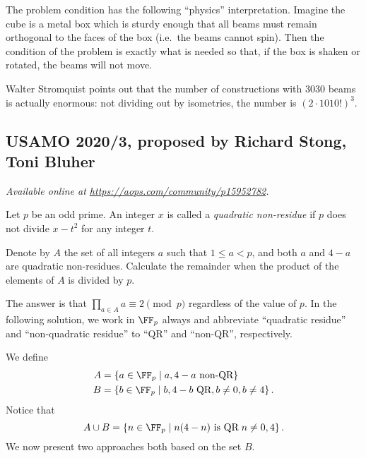 \documentclass[11pt]{scrartcl}
\begin{document}
\begin{remark*}
  The problem condition has the following ``physics'' interpretation.
  Imagine the cube is a metal box which is sturdy enough that
  all beams must remain orthogonal to the faces of the box
  (i.e.\ the beams cannot spin).
  Then the condition of the problem is exactly what is needed so that,
  if the box is shaken or rotated, the beams will not move.
\end{remark*}

\begin{remark*}
  Walter Stromquist points out that the number of constructions
  with $3030$ beams is actually enormous:
  not dividing out by isometries,
  the number is $(2 \cdot 1010!)^3$.
\end{remark*}
\pagebreak

\subsection{USAMO 2020/3, proposed by Richard Stong, Toni Bluher}
\textsl{Available online at \url{https://aops.com/community/p15952782}.}
\begin{mdframed}[style=mdpurplebox,frametitle={Problem statement}]
Let $p$ be an odd prime.
An integer $x$ is called a \emph{quadratic non-residue}
if $p$ does not divide $x-t^2$ for any integer $t$.

Denote by $A$ the set of all integers $a$
such that $1 \le a < p$,
and both $a$ and $4-a$ are quadratic non-residues.
Calculate the remainder
when the product of the elements of $A$ is divided by $p$.
\end{mdframed}
The answer is that $\prod_{a \in A} a \equiv 2 \pmod p$
regardless of the value of $p$.
In the following solution,
we work in $\FF_p$ always
and abbreviate ``quadratic residue'' and ``non-quadratic residue''
to ``QR'' and ``non-QR'', respectively.

We define
\begin{align*}
  A &= \left\{ a \in \FF_p \mid a, 4-a \text{ non-QR} \right\} \\
  B &= \left\{ b \in \FF_p \mid b, 4-b \text{ QR}, b \neq 0, b \neq 4 \right\}.
\end{align*}
Notice that
\[ A \cup B = \left\{ n \in \FF_p \mid
    n(4-n) \text{ is QR} \;
    n \neq 0, 4 \right\}. \]
We now present two approaches both based on the set $B$.
\end{document}
